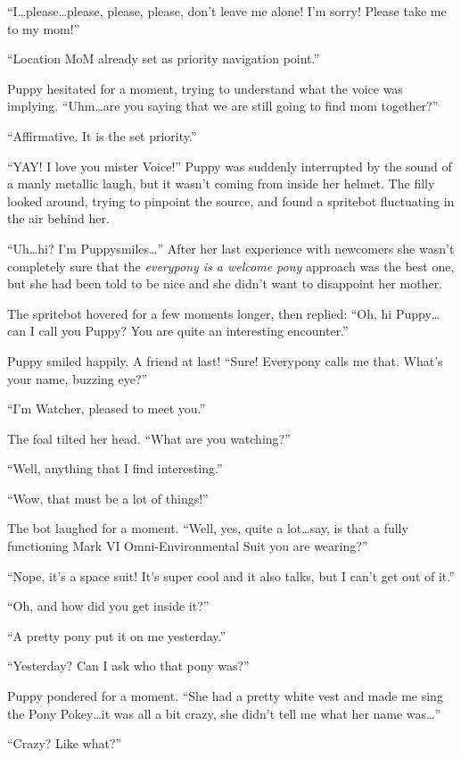 ``I\dots please\dots please, please, please, don't leave me alone! I'm sorry! Please take me to my mom!''

``{\mt Location MoM already set as priority navigation point.}''

Puppy hesitated for a moment, trying to understand what the voice was implying. ``Uhm\dots are you saying that we are still going to find mom together?''

``{\mt Affirmative. It is the set priority.}''

``YAY! I love you mister Voice!'' Puppy was suddenly interrupted by the sound of a manly metallic laugh, but it wasn't coming from inside her helmet. The filly looked around, trying to pinpoint the source, and found a spritebot fluctuating in the air behind her.

``Uh\dots hi? I'm Puppysmiles\dots'' After her last experience with newcomers she wasn't completely sure that the \emph{everypony is a welcome pony} approach was the best one, but she had been told to be nice and she didn't want to disappoint her mother.

The spritebot hovered for a few moments longer, then replied: ``Oh, hi Puppy\dots can I call you Puppy? You are quite an interesting encounter.''

Puppy smiled happily. A friend at last! ``Sure! Everypony calls me that. What's your name, buzzing eye?''

``I'm Watcher, pleased to meet you.''

The foal tilted her head. ``What are you watching?''

``Well, anything that I find interesting.''

``Wow, that must be a lot of things!''

The bot laughed for a moment. ``Well, yes, quite a lot\dots say, is that a fully functioning Mark VI Omni-Environmental Suit you are wearing?''

``Nope, it's a space suit! It's super cool and it also talks, but I can't get out of it.''

``Oh, and how did you get inside it?''

``A pretty pony put it on me yesterday.''

``Yesterday? Can I ask who that pony was?''

Puppy pondered for a moment. ``She had a pretty white vest and made me sing the Pony Pokey\dots it was all a bit crazy, she didn't tell me what her name was\dots''

``Crazy? Like what?''

